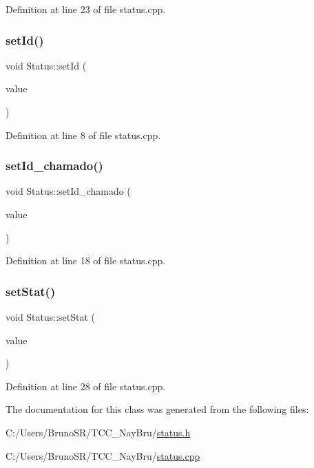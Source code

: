 Definition at line 23 of file status.\+cpp.

\hypertarget{class_status_ac2f0322cbfc1326c117eb2b244600d67}{}\label{class_status_ac2f0322cbfc1326c117eb2b244600d67} 
\subsubsection{\texorpdfstring{set\+Id()}{setId()}}
{\footnotesize\ttfamily void Status\+::set\+Id (\begin{DoxyParamCaption}\item[{int}]{value }\end{DoxyParamCaption})}



Definition at line 8 of file status.\+cpp.

\hypertarget{class_status_aca91a7dbe10715ce9696f4b0252546ac}{}\label{class_status_aca91a7dbe10715ce9696f4b0252546ac} 
\subsubsection{\texorpdfstring{set\+Id\+\_\+chamado()}{setId\_chamado()}}
{\footnotesize\ttfamily void Status\+::set\+Id\+\_\+chamado (\begin{DoxyParamCaption}\item[{int}]{value }\end{DoxyParamCaption})}



Definition at line 18 of file status.\+cpp.

\hypertarget{class_status_aa0507ec449fc02cccb63293fed3232a4}{}\label{class_status_aa0507ec449fc02cccb63293fed3232a4} 
\subsubsection{\texorpdfstring{set\+Stat()}{setStat()}}
{\footnotesize\ttfamily void Status\+::set\+Stat (\begin{DoxyParamCaption}\item[{const Q\+String \&}]{value }\end{DoxyParamCaption})}



Definition at line 28 of file status.\+cpp.



The documentation for this class was generated from the following files\+:\begin{DoxyCompactItemize}
\item 
C\+:/\+Users/\+Bruno\+S\+R/\+T\+C\+C\+\_\+\+Nay\+Bru/\hyperlink{status_8h}{status.\+h}\item 
C\+:/\+Users/\+Bruno\+S\+R/\+T\+C\+C\+\_\+\+Nay\+Bru/\hyperlink{status_8cpp}{status.\+cpp}\end{DoxyCompactItemize}
